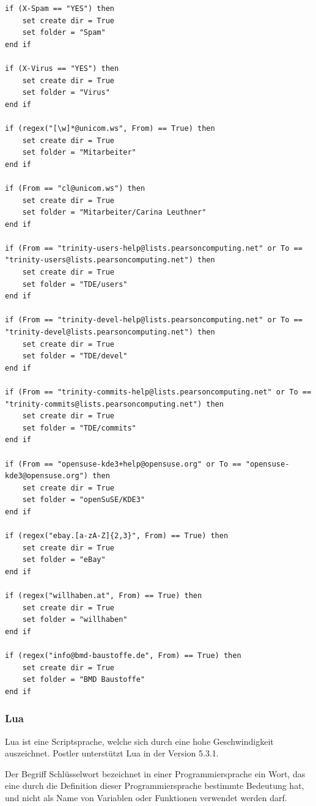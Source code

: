 \documentclass[a4paper,10pt]{article}
\newcounter{subsubsubsection}[subsubsection]
\begin{document}
\begin{lstlisting}
if (X-Spam == "YES") then
    set create dir = True
    set folder = "Spam"
end if

if (X-Virus == "YES") then
    set create dir = True
    set folder = "Virus"
end if

if (regex("[\w]*@unicom.ws", From) == True) then
    set create dir = True
    set folder = "Mitarbeiter"
end if

if (From == "cl@unicom.ws") then
    set create dir = True
    set folder = "Mitarbeiter/Carina Leuthner"
end if

if (From == "trinity-users-help@lists.pearsoncomputing.net" or To == "trinity-users@lists.pearsoncomputing.net") then
    set create dir = True
    set folder = "TDE/users"
end if

if (From == "trinity-devel-help@lists.pearsoncomputing.net" or To == "trinity-devel@lists.pearsoncomputing.net") then
    set create dir = True
    set folder = "TDE/devel"
end if

if (From == "trinity-commits-help@lists.pearsoncomputing.net" or To == "trinity-commits@lists.pearsoncomputing.net") then
    set create dir = True
    set folder = "TDE/commits"
end if

if (From == "opensuse-kde3+help@opensuse.org" or To == "opensuse-kde3@opensuse.org") then
    set create dir = True
    set folder = "openSuSE/KDE3"
end if

if (regex("ebay.[a-zA-Z]{2,3}", From) == True) then
    set create dir = True
    set folder = "eBay"
end if

if (regex("willhaben.at", From) == True) then
    set create dir = True
    set folder = "willhaben"
end if

if (regex("info@bmd-baustoffe.de", From) == True) then
    set create dir = True
    set folder = "BMD Baustoffe"
end if

\end{lstlisting}

\subsubsection{Lua}

Lua ist eine Scriptsprache, welche sich durch eine hohe Geschwindigkeit auszeichnet. Postler unterstützt Lua in der Version 5.3.1.


Der Begriff Schlüsselwort bezeichnet in einer Programmiersprache ein Wort, das eine durch die Definition dieser Programmiersprache bestimmte Bedeutung hat, und nicht als Name von Variablen oder Funktionen verwendet werden darf.
\end{document}
